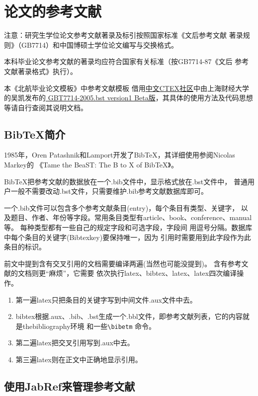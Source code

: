 \chapter{论文的参考文献}
\label{chapter-reference}

注意：研究生学位论文参考文献著录及标引按照国家标准《文后参考文献
著录规则》（GB7714）和中国博硕士学位论文编写与交换格式。

本科毕业论文参考文献的著录均应符合国家有关标准（按GB7714-87《文后
参考文献著录格式》执行）。

本《北航毕业论文\latex{}模板》中参考文献模板
借用\href{http://bbs.ctex.org/forum.php}{中文CTEX社区}中由上海财经大学
的吴凯发布的\href{http://bbs.ctex.org/forum.php?mod=viewthread&tid=33591}
{ GBT7714-2005.bst version1 Beta版}，其具体的使用方法及代码思想
等请自行查阅其说明文档。

\section{BibTeX简介}
\label{section-bibtex}
1985年，Oren Patashnik和Lamport开发了BibTeX，其详细使用参阅Nicolas Markey的
《Tame the BeaST: The B to X of BibTeX》。

BibTeX把参考文献的数据放在一个.bib文件中，显示格式放在.bst文件中，
普通用户一般不需要改动.bst文件，只需要维护.bib参考文献数据库即可。

一个.bib文件可以包含多个参考文献条目(entry)，每个条目有类型、关键字，
以及题目、作者、年份等字段。常用条目类型有article、book、conference、manual等。
每种类型都有一些自己的规定字段和可选字段，字段间
用逗号分隔。数据库中每个条目的关键字(Bibtexkey)要保持唯一，因为
引用时需要用到此字段作为此条目的标识。

前文中提到含有交叉引用的文档需要编译两遍(当然也可能没提到)。
含有参考文献的文档则更“麻烦”，它需要
依次执行latex、bibtex、latex、latex四次编译操作。
\begin{enumerate}
\item 第一遍latex只把条目的关键字写到中间文件.aux文件中去。
\item bibtex根据.aux、.bib、.bst生成一个.bbl文件，即参考文献列表，它的内容就是thebibliography环境
和一些\verb|\bibetm| 命令。
\item 第二遍latex把交叉引用写到.aux中去。
\item 第三遍latex则在正文中正确地显示引用。
\end{enumerate}

\section{使用JabRef来管理参考文献}
